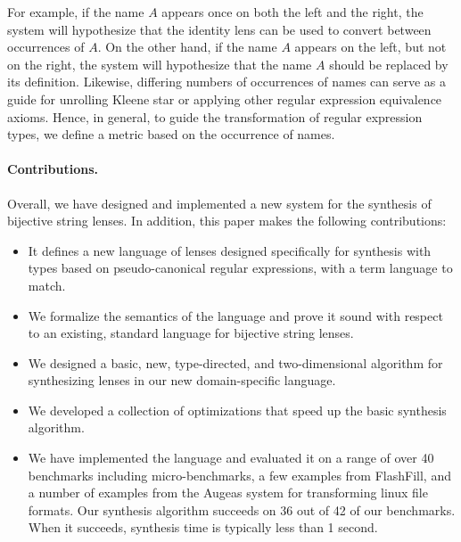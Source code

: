 For example, if the name $A$ appears once on both the left and the right,
the system will hypothesize that the identity lens can be used to convert
between occurrences of $A$.  On the other hand, if the name $A$ appears
on the left, but not on the right, the system will hypothesize that the
name $A$ should be replaced by its definition.  Likewise, differing
numbers of occurrences of names can serve as a guide for unrolling
Kleene star or applying other regular expression equivalence axioms.
Hence, in general, to guide the transformation of regular expression
types, we define a metric based on the occurrence of names.

\paragraph*{Contributions.}  Overall, we have designed and implemented
a new system for the synthesis of bijective string lenses.
In addition, this paper makes the following contributions:

\begin{itemize}
\item It defines a new language of lenses designed specifically for synthesis
with types based on pseudo-canonical regular expressions, with a term 
language to match.
\item We formalize the semantics of the language and prove it sound with
respect to an existing, standard language for bijective string lenses.
\item We designed a basic, new, type-directed, and two-dimensional 
algorithm for synthesizing lenses in our new domain-specific language.
\item We developed a collection of optimizations that speed up the basic
synthesis algorithm.
\item We have implemented the language and evaluated it on a range of
over 40 benchmarks including micro-benchmarks, a few examples from FlashFill,
and a number of examples from the Augeas system for transforming linux
file formats.  Our synthesis algorithm succeeds on 36 out of 42 of our
benchmarks.  When it succeeds, synthesis time is typically less than 1 second.
\end{itemize}




